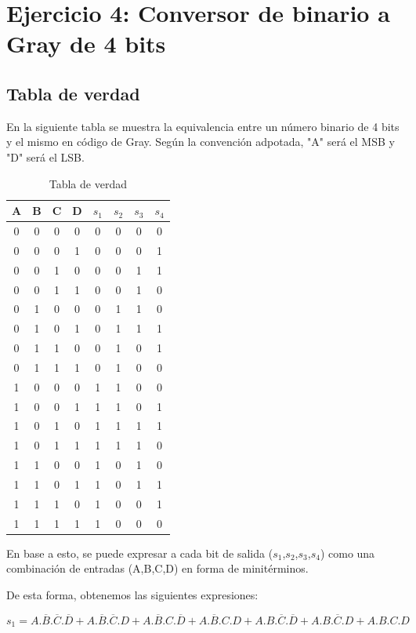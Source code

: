 \section{Ejercicio 4: Conversor de binario a Gray de 4 bits}

\subsection{Tabla de verdad}
En la siguiente tabla se muestra la equivalencia entre un n\'umero binario de 4 bits y el mismo en c\'odigo de Gray. Seg\'un la convenci\'on adpotada, "A" ser\'a el MSB y "D" ser\'a el LSB.

\begin{table}[h!]\caption{Tabla de verdad}
\centering
\begin{tabular}{cccc|cccc}
A & B & C & D & $s_{1}$ & $s_{2}$ & $s_{3}$ & $s_{4}$ \\ \hline
0 & 0 & 0 & 0 & 0  & 0  & 0  & 0  \\
0 & 0 & 0 & 1 & 0  & 0  & 0  & 1  \\
0 & 0 & 1 & 0 & 0  & 0  & 1  & 1  \\
0 & 0 & 1 & 1 & 0  & 0  & 1  & 0  \\
0 & 1 & 0 & 0 & 0  & 1  & 1  & 0  \\
0 & 1 & 0 & 1 & 0  & 1  & 1  & 1  \\
0 & 1 & 1 & 0 & 0  & 1  & 0  & 1  \\
0 & 1 & 1 & 1 & 0  & 1  & 0  & 0  \\
1 & 0 & 0 & 0 & 1  & 1  & 0  & 0  \\
1 & 0 & 0 & 1 & 1  & 1  & 0  & 1  \\
1 & 0 & 1 & 0 & 1  & 1  & 1  & 1  \\
1 & 0 & 1 & 1 & 1  & 1  & 1  & 0  \\
1 & 1 & 0 & 0 & 1  & 0  & 1  & 0  \\
1 & 1 & 0 & 1 & 1  & 0  & 1  & 1  \\
1 & 1 & 1 & 0 & 1  & 0  & 0  & 1  \\
1 & 1 & 1 & 1 & 1  & 0  & 0  & 0 
\end{tabular}
\end{table}

En base a esto, se puede expresar a cada bit de salida ($s_{1}$,$s_{2}$,$s_{3}$,$s_{4}$) como una combinación de entradas (A,B,C,D) en forma de minitérminos.

De esta forma, obtenemos las siguientes expresiones:

\begin{equation}\label{s1_mini}
    s_{1} = A.\overline{B}.\overline{C}.\overline{D} +A.\overline{B}.\overline{C}.D+A.\overline{B}.C.\overline{D}+A.\overline{B}.C.D+A.B.\overline{C}.\overline{D}+A.B.\overline{C}.D+A.B.C.D
\end{equation}

